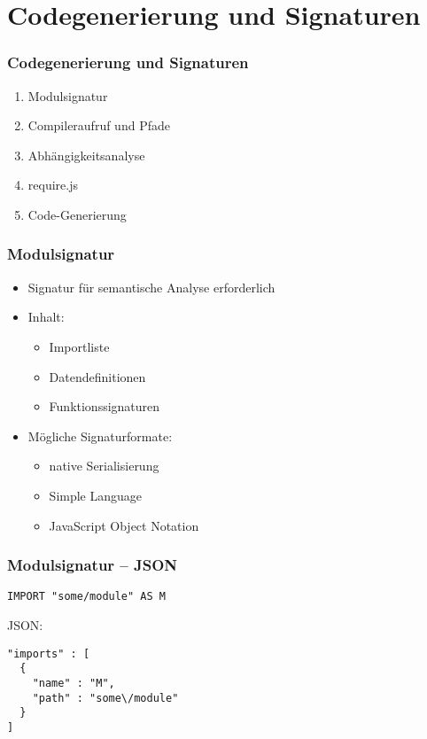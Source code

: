 \section{Codegenerierung und Signaturen}

\begin{frame}
\frametitle{Codegenerierung und Signaturen}
\begin{enumerate}
\item Modulsignatur
\item Compileraufruf und Pfade
\item Abhängigkeitsanalyse
\item require.js
\item Code-Generierung
\end{enumerate}
\end{frame}


\begin{frame}
\frametitle{Modulsignatur}

\begin{itemize}
\item Signatur für semantische Analyse erforderlich
\item Inhalt:
	\begin{itemize}
	\item Importliste
	\item Datendefinitionen
	\item Funktionssignaturen
	\end{itemize}
\item Mögliche Signaturformate:
	\begin{itemize}
	\item native Serialisierung
	\item Simple Language
	\item JavaScript Object Notation
	\end{itemize}
\end{itemize}

\end{frame}


\begin{frame}[containsverbatim=true]
\frametitle{Modulsignatur -- JSON}

\begin{verbatim}
IMPORT "some/module" AS M
\end{verbatim}

JSON:

\begin{lstlisting}
"imports" : [
  {
    "name" : "M",
    "path" : "some\/module"
  }
]
\end{lstlisting}


\end{frame}


